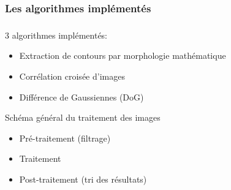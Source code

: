 \documentclass[11pt]{beamer}
\begin{document}
\subsubsection*{Les algorithmes implémentés}

\begin{frame}
\frametitle{\subsubsecname}
\begin{block}{3 algorithmes implémentés:}
\begin{itemize}
\item Extraction de contours par morphologie mathématique
\item Corrélation croisée d'images
\item Différence de Gaussiennes (DoG)
\end{itemize}
\end{block}
\begin{block}{Schéma général du traitement des images}
\begin{itemize}
\item Pré-traitement (filtrage)
\item Traitement 
\item Post-traitement (tri des résultats)
\end{itemize}
\end{block}
\end{frame}
\end{document}
